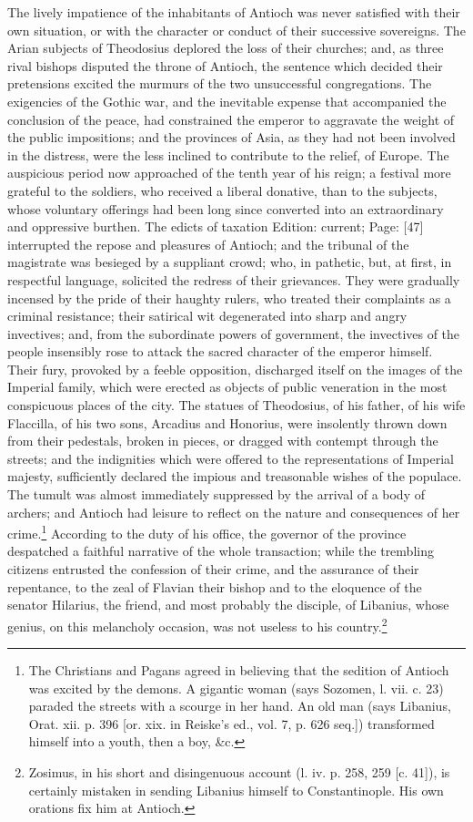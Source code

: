 The lively impatience of the inhabitants of Antioch was never satisfied with their own situation, or with the character or conduct of their successive sovereigns. The Arian subjects of Theodosius deplored the loss of their churches; and, as three rival bishops disputed the throne of Antioch, the sentence which decided their pretensions excited the murmurs of the two unsuccessful congregations. The exigencies of the Gothic war, and the inevitable expense that accompanied the conclusion of the peace, had constrained the emperor to aggravate the weight of the public impositions; and the provinces of Asia, as they had not been involved in the distress, were the less inclined to contribute to the relief, of Europe. The auspicious period now approached of the tenth year of his reign; a festival more grateful to the soldiers, who received a liberal donative, than to the subjects, whose voluntary offerings had been long since converted into an extraordinary and oppressive burthen. The edicts of taxation Edition: current; Page: [47] interrupted the repose and pleasures of Antioch; and the tribunal of the magistrate was besieged by a suppliant crowd; who, in pathetic, but, at first, in respectful language, solicited the redress of their grievances. They were gradually incensed by the pride of their haughty rulers, who treated their complaints as a criminal resistance; their satirical wit degenerated into sharp and angry invectives; and, from the subordinate powers of government, the invectives of the people insensibly rose to attack the sacred character of the emperor himself. Their fury, provoked by a feeble opposition, discharged itself on the images of the Imperial family, which were erected as objects of public veneration in the most conspicuous places of the city. The statues of Theodosius, of his father, of his wife Flaccilla, of his two sons, Arcadius and Honorius, were insolently thrown down from their pedestals, broken in pieces, or dragged with contempt through the streets; and the indignities which were offered to the representations of Imperial majesty, sufficiently declared the impious and treasonable wishes of the populace. The tumult was almost immediately suppressed by the arrival of a body of archers; and Antioch had leisure to reflect on the nature and consequences of her crime.\footnote{The Christians and Pagans agreed in believing that the sedition of Antioch was excited by the demons. A gigantic woman (says Sozomen, l. vii. c. 23) paraded the streets with a scourge in her hand. An old man (says Libanius, Orat. xii. p. 396 [or. xix. in Reiske\texthebrew{}’s ed., vol. 7, p. 626 seq.]) transformed himself into a youth, then a boy, \&c.} According to the duty of his office, the governor of the province despatched a faithful narrative of the whole transaction; while the trembling citizens entrusted the confession of their crime, and the assurance of their repentance, to the zeal of Flavian their bishop and to the eloquence of the senator Hilarius, the friend, and most probably the disciple, of Libanius, whose genius, on this melancholy occasion, was not useless to his country.\footnote{Zosimus, in his short and disingenuous account (l. iv. p. 258, 259 [c. 41]), is certainly mistaken in sending Libanius himself to Constantinople. His own orations fix him at Antioch.} 